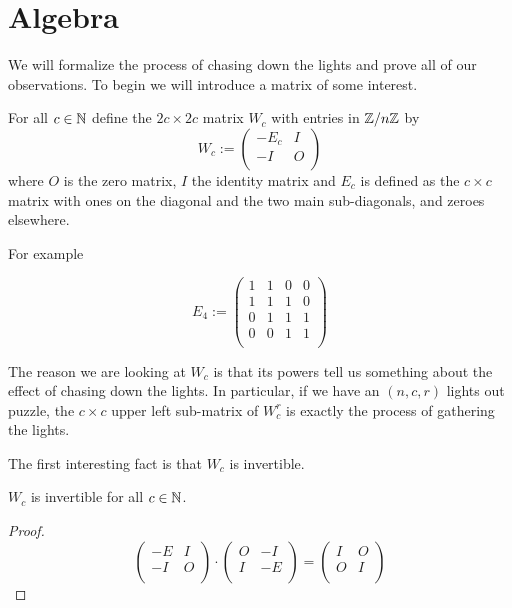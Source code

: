 \section{Algebra}
We will formalize the process of chasing down the lights and prove all of our
observations. To begin we will introduce a matrix of some interest.

For all $c\in\mathbb{N}$ define the $2c\times 2c$ matrix $W_{c}$ with entries in
$\mathbb{Z}/n\mathbb{Z}$ by
\[
W_{c} := \left(
\begin{array}{cc}
  -E_{c} & I \\
  -I    & O \\
\end{array}
\right)
\]
where $O$ is the zero matrix, $I$ the identity matrix and $E_{c}$ is defined
as the $c\times c$ matrix with ones on the diagonal and the two main
sub-diagonals, and zeroes elsewhere.

For example

\[
E_{4} := \left(
\begin{array}{cccc}
  1 & 1 & 0 & 0 \\
  1 & 1 & 1 & 0 \\
  0 & 1 & 1 & 1 \\
  0 & 0 & 1 & 1 \\
\end{array}
\right)
\]

The reason we are looking at $W_{c}$ is that its powers tell us something about
the effect of chasing down the lights. In particular, if we have an $(n, c, r)$
lights out puzzle, the $c \times c$ upper left sub-matrix of $W_{c}^{r}$ is
exactly the process of gathering the lights.

The first interesting fact is that $W_{c}$ is invertible.

\begin{lemma}
  $W_{c}$ is invertible for all $c\in\mathbb{N}$.
\end{lemma}

\begin{proof}
  \[
  \left(
  \begin{array}{cc}
    -E & I \\
    -I & O \\
  \end{array}
  \right)
  \cdot
  \left(
  \begin{array}{cc}
    O & -I  \\
    I & -E \\
  \end{array}
  \right)
  =
  \left(
  \begin{array}{cc}
    I & O \\
    O & I \\
  \end{array}
  \right)
  \]
\end{proof}


